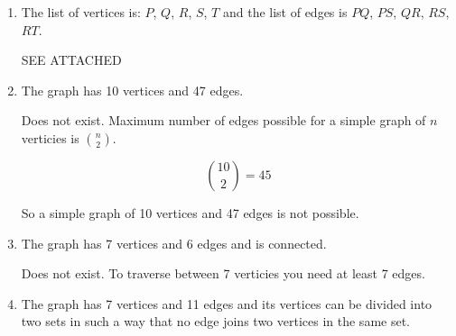 \documentclass[11pt]{article}
\begin{document}
\begin{enumerate}[label= (\alph*)]
  \item The list of vertices is: $P$, $Q$, $R$, $S$, $T$ and the list of edges
    is $PQ$, $PS$, $QR$, $RS$, $RT$.

  SEE ATTACHED

  \item The graph has 10 vertices and 47 edges.

  Does not exist. Maximum number of edges possible for a simple graph of $n$
    verticies is $\binom{n}{2}$.

  \[ \binom{10}{2} = 45 \]

  So a simple graph of 10 vertices and 47 edges is not possible.

  \item The graph has 7 vertices and 6 edges and is connected.

    Does not exist. To traverse between 7 verticies you need at least 7 edges.

  \item The graph has 7 vertices and 11 edges and its vertices can be divided
  into two sets in such a way that no edge joins two vertices in the same set.

\end{enumerate}
\end{document}
